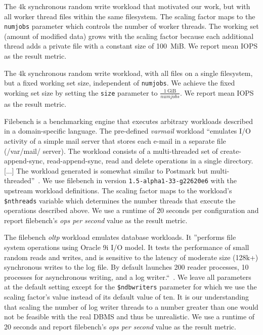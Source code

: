 \documentclass[12pt,a4paper,twoside]{book}
\begin{document}
\begin{description}[noitemsep,leftmargin=1.5cm,labelindent=1cm]
    \item[fio-growing] The 4k synchronous random write workload that motivated our work, but with all worker thread files within the same filesystem.
        The scaling factor maps to the \lstinline{numjobs} parameter which controls the number of worker threads.
        The working set (amount of modified data) grows with the scaling factor because each additional thread adds a private file with a constant size of \SI{100}{MiB}.
        We report mean IOPS as the result metric.

    \item[fio-fixed] The 4k synchronous random write workload, with all files on a single filesystem, but a fixed working set size, independent of \lstinline{numjobs}.
        We achieve the fixed working set size by setting the \lstinline{size} parameter to $\frac{1~\text{GiB}}{numjobs}$.
        We report mean IOPS as the result metric.

    \item[filebench varmail] Filebench is a benchmarking engine that executes arbitrary workloads described in a domain-specific language.
        The pre-defined \textit{varmail} workload
        ``emulates I/O activity of a simple mail server that stores each e-mail in a separate file (/var/mail/ server).
          The workload consists of a multi-threaded set of create-append-sync, read-append-sync, read and delete operations in a single directory.
          [...] The workload generated is somewhat similar to Postmark but multi-threaded''~\cite{FilebenchGitHubWiki}.
        We use filebench in version \lstinline{1.5-alpha1-33-g22620e6} with the upstream workload definitions.
        The scaling factor maps to the workload's \lstinline{$nthreads} variable which determines the number threads that execute the operations described above.
        We use a runtime of 20 seconds per configuration and report filebench's \textit{ops per second} value as the result metric.

    \item[filebench oltp] The filebench \textit{oltp} workload emulates database workloads.
        It ''performs file system operations using Oracle 9i I/O model.
        It tests the performance of small random reads and writes, and is sensitive to the latency of moderate size (128k+) synchronous writes to the log file.
        By default launches 200 reader processes, 10 processes for asynchronous writing, and a log writer.``~\cite{FilebenchGitHubWiki}.
        We leave all parameters at the default setting except for the \lstinline{$ndbwriters} parameter for which we use the scaling factor's value instead of its default value of ten.
        It is our understanding that scaling the number of log writer threads to a number greater than one would not be feasible with the real DBMS and thus be unrealistic.
        We use a runtime of 20 seconds and report filebench's \textit{ops per second} value as the result metric.


\end{description}
\end{document}
